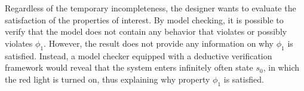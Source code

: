 






Regardless of the temporary incompleteness, the designer wants to evaluate the satisfaction of the properties of  interest. 
By model checking, it is possible to verify that the model does not contain any behavior that violates or possibly violates $\phi_1$. 
However, the result does not provide any information on why $\phi_1$ is satisfied.
Instead, a model checker equipped with a deductive verification framework would reveal that the system enters infinitely often state $s_0$, in which the red light is turned on, thus explaining why property $\phi_1$ is satisfied.

